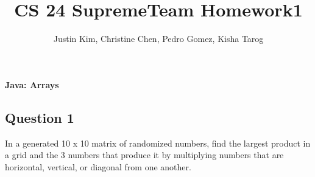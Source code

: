 \documentclass[12pt]{article}
\begin{document}
\title{CS 24 SupremeTeam Homework1}
\author{Justin Kim, Christine Chen, Pedro Gomez, Kisha Tarog}
\maketitle

\noindent
\textbf{Java: Arrays} \\

\begin{flushleft}
\section{Question 1}
In a generated 10 x 10 matrix of randomized numbers, find the largest product in a grid and the 3 numbers that produce it by multiplying numbers that are horizontal, vertical, or diagonal from one another. 


\end{flushleft}
\end{document}
